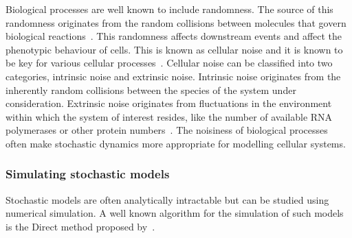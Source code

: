 Biological processes are well known to include randomness. The source of this randomness originates from the random collisions between molecules that govern biological reactions~\autocite{khamash_iglesias:2010}. This randomness affects downstream events and affect the phenotypic behaviour of cells. This is known as cellular noise and it is known to be key for various cellular processes~\autocite{Eldar:2010kk}. Cellular noise can be classified into two categories, intrinsic noise and extrinsic noise. Intrinsic noise originates from the inherently random collisions between the species of the system under consideration. Extrinsic noise originates from fluctuations in the environment within which the system of interest resides, like the number of available RNA polymerases or other protein numbers~\autocite{khamash_iglesias:2010}. The noisiness of biological processes often make stochastic dynamics more appropriate for modelling cellular systems.  



\subsubsection{Simulating stochastic models}

Stochastic models are often analytically intractable but can be studied using numerical simulation. A well known algorithm for the simulation of such models is the Direct method proposed by~\textcite{Gillespie:1977ww}.



